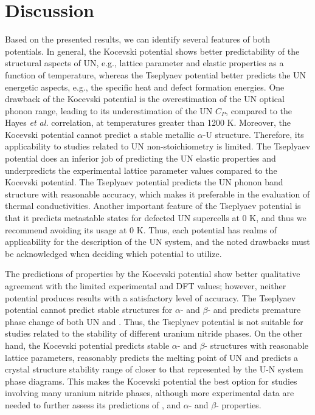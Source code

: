 \documentclass[preprint, 12pt]{elsarticle}
\begin{document}
\section{Discussion}

Based on the presented results, we can identify several features of both potentials. In general, the Kocevski potential shows better predictability of the structural aspects of UN, e.g., lattice parameter and elastic properties as a function of temperature, whereas the Tseplyaev potential better predicts the UN energetic aspects, e.g., the specific heat and defect formation energies. One drawback of the Kocevski potential is the overestimation of the UN optical phonon range, leading to its underestimation of the UN $C_P$, compared to the Hayes \textit{et al.} \cite{Hayes1990IV} correlation, at temperatures greater than 1200 K. Moreover, the Kocevski potential cannot predict a stable metallic $\alpha$-U structure. Therefore, its applicability to studies related to UN non-stoichiometry is limited. The Tseplyaev potential does an inferior job of predicting the UN elastic properties and underpredicts the experimental lattice parameter values compared to the Kocevski potential. The Tseplyaev potential predicts the UN phonon band structure with reasonable accuracy, which makes it preferable in the evaluation of thermal conductivities. Another important feature of the Tseplyaev potential is that it predicts metastable states for defected UN supercells at 0 K, and thus we recommend avoiding its usage at 0 K. Thus, each potential has realms of applicability for the description of the UN system, and the noted drawbacks must be acknowledged when deciding which potential to utilize. 

The predictions of  properties by the Kocevski potential show better qualitative agreement with the limited experimental and DFT values; however, neither potential produces results with a satisfactory level of accuracy. The Tseplyaev potential cannot predict stable structures for $\alpha$- and $\beta$- and predicts premature phase change of both UN and . Thus, the Tseplyaev potential is not suitable for studies related to the stability of different uranium nitride phases. On the other hand, the Kocevski potential predicts stable $\alpha$- and $\beta$- structures with reasonable lattice parameters, reasonably predicts the melting point of UN and predicts a crystal structure stability range of  closer to that represented by the U-N system phase diagrams. This makes the Kocevski potential the best option for studies involving many uranium nitride phases, although more experimental data are needed to further assess its predictions of , and $\alpha$- and $\beta$- properties.
\end{document}
